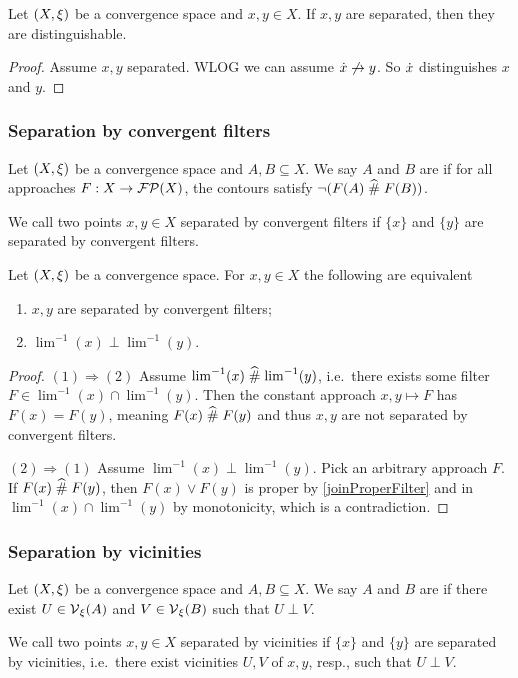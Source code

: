 \begin{lemma} \label{separatedDistinguishable}
Let $\sSet{X,\xi}$ be a convergence space and $x,y\in X$. If $x,y$ are separated, then they are distinguishable.
\end{lemma}
\begin{proof}
Assume $x,y$ separated. WLOG we can assume $\dot{x} \not\to y$. So $\dot{x}$ distinguishes $x$ and $y$.
\end{proof}

\subsubsection{Separation by convergent filters}
\begin{definition}
Let $\sSet{X,\xi}$ be a convergence space and $A,B\subseteq X$. We say $A$ and $B$ are  if for all approaches $F:X\to \operatorname{\mathcal{FP}}(X)$, the contours satisfy $\neg(F(A)\mathrel{\widehat{\#}} F(B))$.

We call two points $x,y\in X$ separated by convergent filters if $\{x\}$ and $\{y\}$ are separated by convergent filters.
\end{definition}

\begin{lemma} \label{pointsSeparatedConvergentFilters}
Let $\sSet{X,\xi}$ be a convergence space. For $x,y\in X$ the following are equivalent
\begin{enumerate}
\item $x,y$ are separated by convergent filters;
\item $\lim^{-1}(x)\perp \lim^{-1}(y)$.
\end{enumerate}
\end{lemma}
\begin{proof}
$(1) \Rightarrow (2)$ Assume $\lim^{-1}(x)\mathrel{\widehat{\#}} \lim^{-1}(y)$, i.e.\ there exists some filter $F\in \lim^{-1}(x)\cap \lim^{-1}(y)$. Then the constant approach $x,y\mapsto F$ has $F(x) = F(y)$, meaning $F(x)\mathrel{\widehat{\#}} F(y)$ and thus $x,y$ are not separated by convergent filters.

$(2) \Rightarrow (1)$ Assume $\lim^{-1}(x)\perp \lim^{-1}(y)$. Pick an arbitrary approach $F$. If $F(x)\mathrel{\widehat{\#}} F(y)$, then $F(x)\vee F(y)$ is proper by \ref{joinProperFilter} and in $\lim^{-1}(x)\cap \lim^{-1}(y)$ by monotonicity, which is a contradiction.
\end{proof}


\subsubsection{Separation by vicinities}
\begin{definition}
Let $\sSet{X,\xi}$ be a convergence space and $A,B\subseteq X$. We say $A$ and $B$ are  if there exist $U\in \operatorname{\mathcal{V}}_\xi(A)$ and $V\in\operatorname{\mathcal{V}}_\xi(B)$ such that $U\perp V$.

We call two points $x,y\in X$ separated by vicinities if $\{x\}$ and $\{y\}$ are separated by vicinities, i.e.\ there exist vicinities $U,V$ of $x,y$, resp., such that $U\perp V$.
\end{definition}


